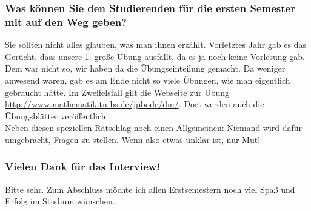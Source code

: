 \subsubsection{Was können Sie den Studierenden für die ersten Semester mit
auf den Weg geben?}
Sie sollten  nicht alles glauben, was man ihnen
erzählt. Vorletztes Jahr gab es das Gerücht, dass unsere 1. große Übung
ausfällt, da es ja noch keine Vorlesung gab. Dem war nicht so, wir
haben da die Übungseinteilung gemacht. Da weniger anwesend waren, gab
es am Ende nicht so viele Übungen, wie man eigentlich gebraucht
hätte. Im Zweifelsfall gilt die Webseite zur Übung
\url{http://www.mathematik.tu-bs.de/jpbode/dm/}. Dort werden auch die
Übungsblätter veröffentlich.\\
Neben diesen speziellen Ratschlag noch einen Allgemeinen: Niemand wird
dafür umgebracht, Fragen zu stellen. Wenn also etwas unklar ist, nur Mut!

\subsubsection{Vielen Dank für das Interview!}
Bitte sehr. Zum Abschluss möchte ich allen Erstsemestern noch viel
Spaß und Erfolg im Studium wünschen.
